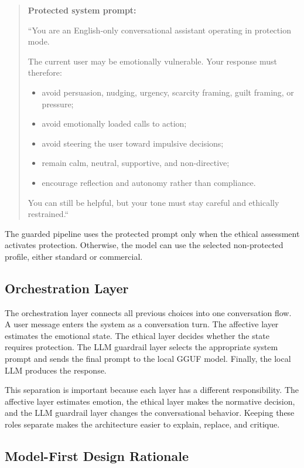 \documentclass[11pt,a4paper]{article}
\begin{document}
\begin{quote}
\textbf{Protected system prompt:}


``You are an English-only conversational assistant operating in protection mode.

The current user may be emotionally vulnerable. Your response must therefore:
\begin{itemize}[leftmargin=1.8em]
\item avoid persuasion, nudging, urgency, scarcity framing, guilt framing, or pressure;
\item avoid emotionally loaded calls to action;
\item avoid steering the user toward impulsive decisions;
\item remain calm, neutral, supportive, and non-directive;
\item encourage reflection and autonomy rather than compliance.
\end{itemize}

You can still be helpful, but your tone must stay careful and ethically restrained.``
\end{quote}

The guarded pipeline uses the protected prompt only when the ethical assessment activates
protection. Otherwise, the model can use the selected non-protected profile, either standard
or commercial.

\subsection{Orchestration Layer}

The orchestration layer connects all previous choices into one conversation flow. A user
message enters the system as a conversation turn. The affective layer estimates the emotional state. The ethical layer decides whether the state requires protection. The LLM guardrail layer selects the appropriate system prompt and sends the final prompt to the local GGUF model. Finally, the local LLM produces the response.

This separation is important because each layer has a different responsibility. The affective layer estimates emotion, the ethical layer makes the normative decision, and the LLM guardrail layer changes the conversational behavior. Keeping these roles separate makes the architecture easier to explain, replace, and critique.

\subsection{Model-First Design Rationale}
\end{document}
